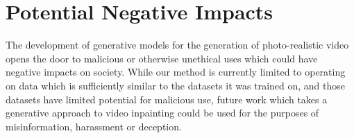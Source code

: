 \chapter{Potential Negative Impacts}
The development of generative models for the generation of photo-realistic video opens the door to malicious or otherwise unethical uses which could have negative impacts on society. While our method is currently limited to operating on data which is sufficiently similar to the datasets it was trained on, and those datasets have limited potential for malicious use, future work which takes a generative approach to video inpainting could be used for the purposes of misinformation, harassment or deception. 